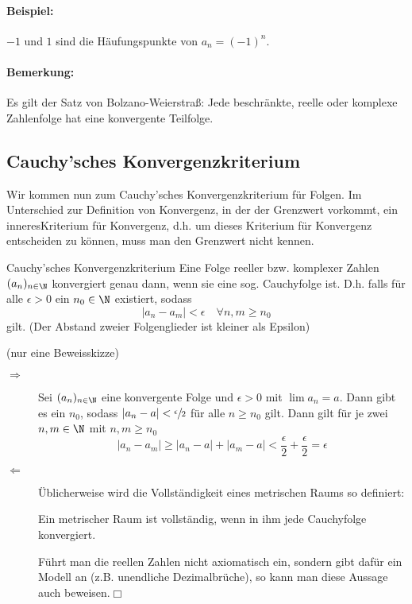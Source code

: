 \paragraph{Beispiel:}
$-1$ und $1$ sind die Häufungspunkte von $a_n=(-1)^n$.

\paragraph{Bemerkung:}
Es gilt der Satz von Bolzano-Weierstraß: Jede beschränkte, reelle oder komplexe Zahlenfolge hat eine konvergente Teilfolge.

\subsection{Cauchy'sches Konvergenzkriterium}
Wir kommen nun zum Cauchy'sches Konvergenzkriterium für Folgen. Im Unterschied zur Definition von Konvergenz, in der der Grenzwert vorkommt, ein \glqq inneres\grqq Kriterium für Konvergenz, d.h. um dieses Kriterium für Konvergenz entscheiden zu können, muss man den Grenzwert nicht kennen.

\begin{satz}{Cauchy'sches Konvergenzkriterium}
	Eine Folge reeller bzw. komplexer Zahlen $(a_n)_{n\in\N}$ konvergiert genau dann, wenn sie eine sog. Cauchyfolge ist. D.h. falls für alle $\epsilon>0$ ein $n_0\in\N$ existiert, sodass
	\begin{equation*}
		|a_n-a_m|<\epsilon \quad\forall n,m\geq n_0
	\end{equation*}
	gilt. (Der Abstand zweier Folgenglieder ist kleiner als Epsilon)
\end{satz}
\beweis
(nur eine Beweisskizze)

\begin{description}
	\item[\glqq$\Rightarrow$\grqq] Sei $(a_n)_{n\in\N}$ eine konvergente Folge und $\epsilon>0$ mit $\lim a_n=a$. Dann gibt es ein $n_0$, sodass $|a_n-a|<\sfrac\epsilon2$ für alle $n\geq n_0$ gilt. Dann gilt für je zwei $n,m\in\N$ mit $n,m\geq n_0$
	\begin{equation*}
		|a_n-a_m|\geq |a_n-a|+|a_m-a|<\frac\epsilon2+\frac\epsilon2=\epsilon
	\end{equation*}

	\item[\glqq$\Leftarrow$\grqq] Üblicherweise wird die Vollständigkeit eines metrischen Raums so definiert:

	\glqq Ein metrischer Raum ist vollständig, wenn in ihm jede Cauchyfolge konvergiert.\grqq

	Führt man die reellen Zahlen nicht axiomatisch ein, sondern gibt dafür ein Modell an (z.B. unendliche Dezimalbrüche), so kann man diese Aussage auch beweisen.\hfill$\Box$
\end{description}
